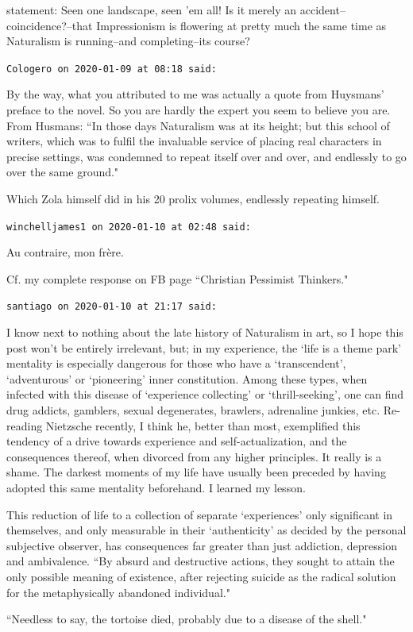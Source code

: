 \begin{footnotesize}
\begin{sffamily}
statement: Seen one landscape, seen 'em all! Is it merely an accident–coincidence?–that Impressionism is flowering at pretty much the same time as Naturalism is running–and completing–its course?


\hfill

\texttt{Cologero on 2020-01-09 at 08:18 said: }

By the way, what you attributed to me was actually a quote from Huysmans' preface to the novel. So you are hardly the expert you seem to believe you are. From Husmans: ``In those days Naturalism was at its height; but this school of writers, which was to fulfil the invaluable service of placing real characters in precise settings, was condemned to repeat itself over and over, and endlessly to go over the same ground."

Which Zola himself did in his 20 prolix volumes, endlessly repeating himself.


\hfill

\texttt{winchelljames1 on 2020-01-10 at 02:48 said: }

Au contraire, mon frère.

Cf. my complete response on FB page ``Christian Pessimist Thinkers."


\hfill

\texttt{santiago on 2020-01-10 at 21:17 said: }

I know next to nothing about the late history of Naturalism in art, so I hope this post won't be entirely irrelevant, but; in my experience, the `life is a theme park' mentality is especially dangerous for those who have a `transcendent', `adventurous' or `pioneering' inner constitution. Among these types, when infected with this disease of `experience collecting' or `thrill-seeking', one can find drug addicts, gamblers, sexual degenerates, brawlers, adrenaline junkies, etc. Re-reading Nietzsche recently, I think he, better than most, exemplified this tendency of a drive towards experience and self-actualization, and the consequences thereof, when divorced from any higher principles. It really is a shame. The darkest moments of my life have usually been preceded by having adopted this same mentality beforehand. I learned my lesson.

This reduction of life to a collection of separate `experiences' only significant in themselves, and only measurable in their `authenticity' as decided by the personal subjective observer, has consequences far greater than just addiction, depression and ambivalence. ``By absurd and destructive actions, they sought to attain the only possible meaning of existence, after rejecting suicide as the radical solution for the metaphysically abandoned individual." 

``Needless to say, the tortoise died, probably due to a disease of the shell."


\end{sffamily}\end{footnotesize}
